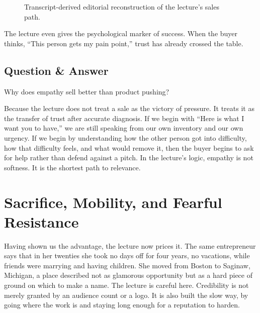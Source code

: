 \begin{figure}
\centering
{}
\caption{Transcript-derived editorial reconstruction of the lecture's sales path.}
\end{figure}

The lecture even gives the psychological marker of success. When the buyer thinks, ``This person gets my pain point,'' trust has already crossed the table.

\subsection{Question \& Answer}

Why does empathy sell better than product pushing?

Because the lecture does not treat a sale as the victory of pressure. It treats it as the transfer of trust after accurate diagnosis. If we begin with ``Here is what I want you to have,'' we are still speaking from our own inventory and our own urgency. If we begin by understanding how the other person got into difficulty, how that difficulty feels, and what would remove it, then the buyer begins to ask for help rather than defend against a pitch. In the lecture's logic, empathy is not softness. It is the shortest path to relevance.

\section{Sacrifice, Mobility, and Fearful Resistance}

Having shown us the advantage, the lecture now prices it. The same entrepreneur says that in her twenties she took no days off for four years, no vacations, while friends were marrying and having children. She moved from Boston to Saginaw, Michigan, a place described not as glamorous opportunity but as a hard piece of ground on which to make a name. The lecture is careful here. Credibility is not merely granted by an audience count or a logo. It is also built the slow way, by going where the work is and staying long enough for a reputation to harden.

